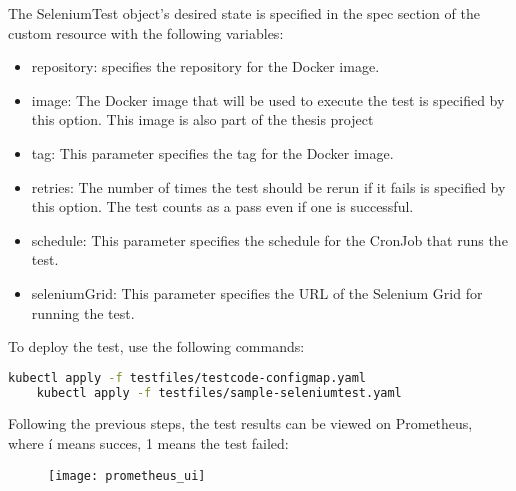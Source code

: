 The SeleniumTest object's desired state is specified in the spec section of the custom resource with the following variables:

\begin{itemize}
	\item repository: specifies the repository for the Docker image.
	\item image: The Docker image that will be used to execute the test is specified by this option. This image is also part of the thesis project
	\item tag: This parameter specifies the tag for the Docker image.
	\item retries: The number of times the test should be rerun if it fails is specified by this option. The test counts as a pass even if one is successful.
	\item schedule: This parameter specifies the schedule for the CronJob that runs the test.
	\item seleniumGrid: This parameter specifies the URL of the Selenium Grid for running the test.
\end{itemize}

To deploy the test, use the following commands:
\begin{lstlisting}[language=bash]
	kubectl apply -f testfiles/testcode-configmap.yaml
	kubectl apply -f testfiles/sample-seleniumtest.yaml
\end{lstlisting}

Following the previous steps, the test results can be viewed on Prometheus, where í means succes, 1 means the test failed:
\begin{figure}[H]
	\centering
	\texttt{[image: prometheus\_ui]}
	\label{fig:prometheus_ui}
\end{figure}